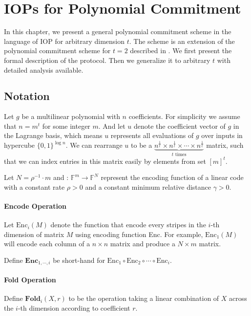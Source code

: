 \chapter{IOPs for Polynomial Commitment}

In this chapter, we present a general polynomial commitment scheme in the language of IOP for arbitrary dimension $t$. The scheme is an extension of the polynomial commitment scheme for $t=2$ described in \cite{brakedown}. We first present the formal description of the protocol. Then we generalize it to arbitrary $t$ with detailed analysis available.

\section{Notation}

Let $g$ be a multilinear polynomial with $n$ coefficients. For simplicity we assume that $n = m^t$ for some integer $m$. And let $u$ denote the coefficient vector of $g$ in the Lagrange basis, which means $u$ represents all evaluations of $g$ over inputs in hypercube $\{0, 1\}^{\log n}$. 
We can rearrange $u$ to be a $\underbrace{n^{\frac{1}{t}} \times n^{\frac{1}{t}} \times \cdots \times n^{\frac{1}{t}}}_{t \text{ times}}$ matrix, such that we can index entries in this matrix easily by elements from set $[m]^t$.

Let $N = \rho^{-1} \cdot m$ and : $\mathbb{F}^m \rightarrow \mathbb{F}^N$ represent the encoding function of a linear code with a constant rate $\rho > 0$ and a constant minimum relative distance $\gamma > 0$.

\subsubsection{Encode Operation}

Let $\text{Enc}_i(M)$ denote the function that encode every stripes in the $i$-th dimension of matrix $M$ using encoding function Enc. For example, $\text{Enc}_1(M)$ will encode each column of a $n \times n $ matrix and produce a $N \times m$ matrix.


Define $\textbf{Enc}_{1,\cdots,i}$ be short-hand for $\text{Enc}_1 \circ \text{Enc}_2 \circ \cdots \circ \text{Enc}_{i}$.

\subsubsection{Fold Operation}

Define $\textbf{Fold}_i(X, r)$ to be the operation taking a linear combination of $X$ across the $i$-th dimension according to coefficient $r$. 

